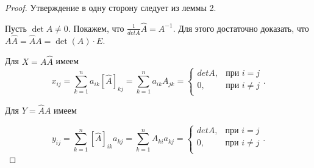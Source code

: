 \begin{proof}
    Утверждение в одну сторону следует из леммы 2.

    \bigskip
    Пусть $\det A \neq 0$. Покажем, что $\frac{1}{detA} \widehat{A} = A^{-1}$.
    Для этого достаточно доказать, что $A \widehat{A} = \widehat{A} A = \det(A) \cdot E$.

    Для $X = A \widehat{A}$ имеем
    \begin{equation*}
        x_{ij} = \sum_{k = 1}^n a_{ik} [\widehat{A}]_{kj} = \sum_{k = 1}^n a_{ik} A_{jk} = \begin{cases}
            detA, &\text{при }  i = j  \\
            0, &\text{при } i \neq j \\
        \end{cases}
    .\end{equation*}

    Для $Y = \widehat{A} A$ имеем

    \begin{equation*}
        y_{ij} = \sum_{k = 1}^n [\widehat{A}]_{ik} a_{kj} = \sum_{k = 1}^n A_{ki} a_{kj} = \begin{cases}
            detA, &\text{при }  i = j  \\
            0, &\text{при } i \neq j \\
        \end{cases}
    .\end{equation*}
\end{proof}
